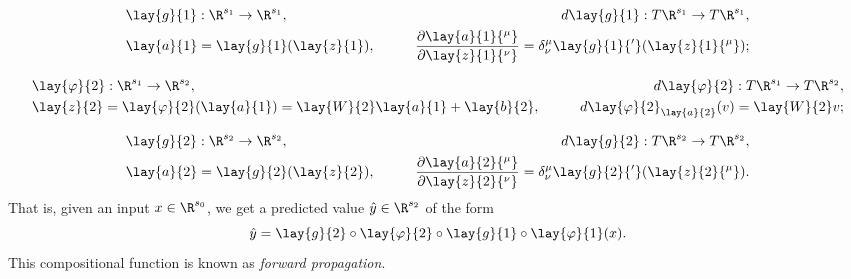 \begin{align*}
	&\lay{g}{1}:\R^{s_1}\to\R^{s_1},\qquad &
	d\lay{g}{1}:T\R^{s_1}\to T\R^{s_1},\\
	&\lay{a}{1}=\lay{g}{1}(\lay{z}{1}),\qquad
	&\frac{\partial\lay{a}{1}{^\mu}}{\partial \lay{z}{1}{^\nu}}=\delta^\mu_\nu\lay{g}{1}{'}(\lay{z}{1}{^\mu});
\end{align*}

\begin{align*}
&\lay{\varphi}{2}:\R^{s_1}\to\R^{s_2},\qquad
&d\lay{\varphi}{2}:T\R^{s_1}\to T\R^{s_2},\\
&\lay{z}{2}=\lay{\varphi}{2}(\lay{a}{1})=\lay{W}{2}\lay{a}{1}+\lay{b}{2},\qquad &d\lay{\varphi}{2}_{\lay{a}{2}}(v)=\lay{W}{2}v;
\end{align*}

\begin{align*}
	&\lay{g}{2}:\R^{s_2}\to\R^{s_2},\qquad
	&d\lay{g}{2}:T\R^{s_2}\to T\R^{s_2},\\
	&\lay{a}{2}=\lay{g}{2}(\lay{z}{2}),\qquad
	&\frac{\partial\lay{a}{2}{^\mu}}{\partial \lay{z}{2}{^\nu}}=\delta^\mu_\nu\lay{g}{2}{'}(\lay{z}{2}{^\mu}).
\end{align*}
That is, given an input $x\in\R^{s_0}$, we get a predicted value $\hat{y}\in\R^{s_2}$ of the form
$$\hat{y}=\lay{g}{2}\circ\lay{\varphi}{2}\circ\lay{g}{1}\circ\lay{\varphi}{1}(x).$$
This compositional function is known as \textit{forward propagation}.

